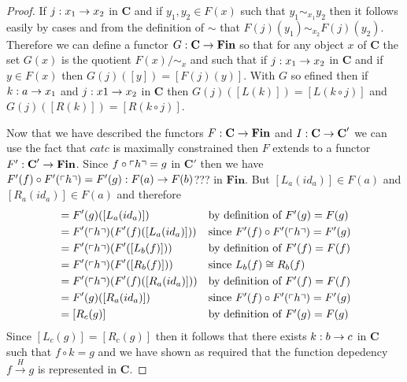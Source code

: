 \documentclass[10pt,a4paper]{article}
\theoremstyle{remark}
\newcommand{\catc}[1][C]{\textbf{#1}}
\newcommand{\catcp}[1][C]{\textbf{#1}'}
\newcommand{\Fin}{\ensuremath{\textbf{Fin}} }
\newcommand{\fundep}[3]{#2 \xrightarrow{#1} #3}
\begin{document}
\begin{proof}
If $j: x_1 \rightarrow x_2$ in $\catc$ and if $y_1,y_2 \in F(x)$ such that $y_1 \sim_{x_1} y_2$
then it follows easily by cases and from the definition of $\sim$ that $F(j)(y_1) \sim_{x_2} F(j)(y_2)$.
Therefore we can define a functor 
 $G: \catc \morph \Fin$  so that for any object $x$ of $\catc$
the set $G(x)$ is the quotient $F(x)/{\sim_x}$ and such that 
if $j: x_1 \rightarrow x_2$ in $\catc$ and if $y \in F(x)$ then $G(j)([y])=[F(j)(y)]$.
With $G$ so efined then if $k: a \rightarrow x_1$ and $j:x1 \rightarrow x_2$ in $\catc$
then  $G(j)([L(k)])=[L(k \circ j)]$ and $G(j)([R(k)])=[R(k \circ j)]$. 

Now that we have described the functors  $F: \catc \morph \Fin$ and $I:\catc \morph \catcp$
we can use the fact that $catc$ is maximally constrained then $F$ extends to a functor 
$F' : \catcp \morph \Fin$. Since $f \circ \left\ulcorner h\right\urcorner = g$ in $\catcp$ then we have
 $F'(f) \circ F'(\left\ulcorner h\right\urcorner) = F'(g): F(a) \rightarrow F(b)$??? in $\Fin$.
But $[L_a(id_a)] \in F(a)$ and $[R_a(id_a)] \in F(a)$ and therefore
\begin{align*}
[L_c(g)]&= F'(g)([L_a(id_a)])              & & \mbox{by definition of $F'(g)=F(g)$}           \\
        &= F'(\qq{h}) (F'(f)([L_a(id_a)])) & & \mbox{since $F'(f) \circ F'(\qq{h}) = F'(g)$}  \\
				&= F'(\qq{h}) (F'([L_b(f)]))       & & \mbox{by definition of $F'(f)=F(f)$}           \\
				&= F'(\qq{h}) (F'([R_b(f)]))       & & \mbox{since $L_b(f) \cong R_b(f)$}             \\
				&= F'(\qq{h}) (F'(f)([R_a(id_a)])) & & \mbox{by definition of $F'(f)=F(f)$}           \\
		    &= F'(g)([R_a(id_a)])              & & \mbox{since $F'(f) \circ F'(\qq{h}) = F'(g)$}  \\
				&= [R_c(g)]                        & & \mbox{by definition of $F'(g)=F(g)$}           \\
\end{align*}
Since $[L_c(g)]=[R_c(g)]$ then it follows that there exists $k:b \rightarrow c$ in 
$\catc$ such that $f \circ k = g$ and we have shown as required that the function depedency
$\fundep{H}{f}{g}$ is represented in $\catc$.

\end{proof}
\end{document}
